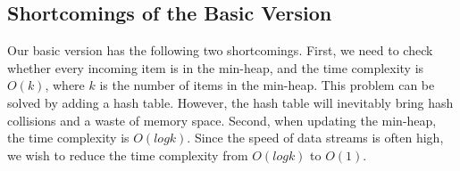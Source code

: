 \vvv
\presub
\subsection{Shortcomings of the Basic Version}
\postsub

Our basic version has the following two shortcomings.
%
%
First, we need to check whether every incoming item is in the min-heap, and the time complexity is $O(k)$, where $k$ is the number of items in the min-heap. 
%
This problem can be solved by adding a hash table. However, the hash table will inevitably bring hash collisions and a waste of memory space. 
%
Second, when updating the min-heap, the time complexity is $O(logk)$. Since the speed of data streams is often high, we wish to reduce the time complexity from $O(logk)$ to $O(1)$.